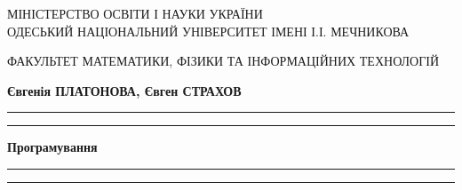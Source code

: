 \begin{titlepage} %
	\newcommand{\HRule}{\rule{\linewidth}{0.5mm}} %
	
	\centering %
	
	\Large МІНІСТЕРСТВО ОСВІТИ І НАУКИ УКРАЇНИ\\  %
	\medskip
	\large ОДЕСЬКИЙ НАЦІОНАЛЬНИЙ УНІВЕРСИТЕТ ІМЕНІ І.І. МЕЧНИКОВА%
	
	\large ФАКУЛЬТЕТ МАТЕМАТИКИ, ФІЗИКИ ТА ІНФОРМАЦІЙНИХ ТЕХНОЛОГІЙ %
	
	
	\vspace*{5\baselineskip} %
	
	
	{\Large 	\textbf{Євгенія ПЛАТОНОВА, Євген СТРАХОВ}\\} %
	
	\vspace{1\baselineskip} %
	\rule{\textwidth}{1.6pt}\vspace*{-\baselineskip}\vspace*{2pt} %
	\rule{\textwidth}{0.4pt} %
	
	\vspace{1\baselineskip} %
	
	{\LARGE \textbf{Програмування}} %
	
	\vspace{0.5\baselineskip} %
	
	\rule{\textwidth}{0.4pt}\vspace*{-\baselineskip}\vspace{3.2pt} %
	\rule{\textwidth}{1.6pt} %
	
	\vspace{1\baselineskip} %
	

\end{titlepage}
